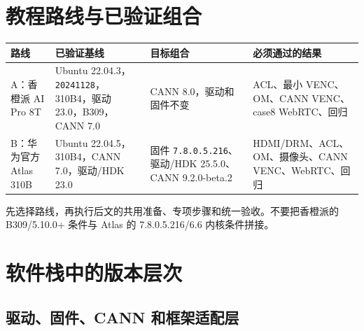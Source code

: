 \section{教程路线与已验证组合}\label{ux6559ux7a0bux8defux7ebfux4e0eux5df2ux9a8cux8bc1ux7ec4ux5408}

\begin{longtable}[]{@{}
  >{\raggedright\arraybackslash}p{}
  >{\raggedright\arraybackslash}p{}
  >{\raggedright\arraybackslash}p{}
  >{\raggedright\arraybackslash}p{}@{}}
\toprule\noalign{}
\begin{minipage}[b]{\linewidth}\raggedright
路线
\end{minipage} & \begin{minipage}[b]{\linewidth}\raggedright
已验证基线
\end{minipage} & \begin{minipage}[b]{\linewidth}\raggedright
目标组合
\end{minipage} & \begin{minipage}[b]{\linewidth}\raggedright
必须通过的结果
\end{minipage} \\
\midrule\noalign{}
\endhead
\bottomrule\noalign{}
\endlastfoot
A：香橙派 AI Pro 8T & Ubuntu
22.04.3，\passthrough{\lstinline!20241128!}，310B4，驱动
23.0，B309，CANN 7.0 & CANN 8.0，驱动和固件不变 & ACL、最小
VENC、OM、CANN VENC、case8 WebRTC、回归 \\
B：华为官方 Atlas 310B & Ubuntu 22.04.5，310B4，CANN 7.0，驱动/HDK 23.0
& 固件 \passthrough{\lstinline!7.8.0.5.216!}、驱动/HDK 25.5.0、CANN
9.2.0-beta.2 & HDMI/DRM、ACL、OM、摄像头、CANN VENC、WebRTC、回归 \\
\end{longtable}

先选择路线，再执行后文的共用准备、专项步骤和统一验收。不要把香橙派的
B309/5.10.0+ 条件与 Atlas 的 7.8.0.5.216/6.6 内核条件拼接。

\section{软件栈中的版本层次}\label{ux8f6fux4ef6ux6808ux4e2dux7684ux7248ux672cux5c42ux6b21}

\subsection{驱动、固件、CANN
和框架适配层}\label{ux9a71ux52a8ux56faux4ef6cann-ux548cux6846ux67b6ux9002ux914dux5c42}


